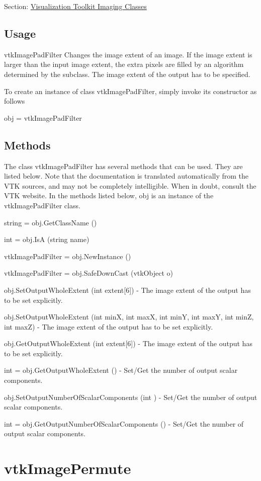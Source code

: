 Section\-: \hyperlink{sec_vtkimaging}{Visualization Toolkit Imaging Classes} \hypertarget{vtkwidgets_vtkxyplotwidget_Usage}{}\subsection{Usage}\label{vtkwidgets_vtkxyplotwidget_Usage}
vtk\-Image\-Pad\-Filter Changes the image extent of an image. If the image extent is larger than the input image extent, the extra pixels are filled by an algorithm determined by the subclass. The image extent of the output has to be specified.

To create an instance of class vtk\-Image\-Pad\-Filter, simply invoke its constructor as follows \begin{DoxyVerb}  obj = vtkImagePadFilter
\end{DoxyVerb}
 \hypertarget{vtkwidgets_vtkxyplotwidget_Methods}{}\subsection{Methods}\label{vtkwidgets_vtkxyplotwidget_Methods}
The class vtk\-Image\-Pad\-Filter has several methods that can be used. They are listed below. Note that the documentation is translated automatically from the V\-T\-K sources, and may not be completely intelligible. When in doubt, consult the V\-T\-K website. In the methods listed below, {\ttfamily obj} is an instance of the vtk\-Image\-Pad\-Filter class. 
\begin{DoxyItemize}
\item {\ttfamily string = obj.\-Get\-Class\-Name ()}  
\item {\ttfamily int = obj.\-Is\-A (string name)}  
\item {\ttfamily vtk\-Image\-Pad\-Filter = obj.\-New\-Instance ()}  
\item {\ttfamily vtk\-Image\-Pad\-Filter = obj.\-Safe\-Down\-Cast (vtk\-Object o)}  
\item {\ttfamily obj.\-Set\-Output\-Whole\-Extent (int extent\mbox{[}6\mbox{]})} -\/ The image extent of the output has to be set explicitly.  
\item {\ttfamily obj.\-Set\-Output\-Whole\-Extent (int min\-X, int max\-X, int min\-Y, int max\-Y, int min\-Z, int max\-Z)} -\/ The image extent of the output has to be set explicitly.  
\item {\ttfamily obj.\-Get\-Output\-Whole\-Extent (int extent\mbox{[}6\mbox{]})} -\/ The image extent of the output has to be set explicitly.  
\item {\ttfamily int = obj.\-Get\-Output\-Whole\-Extent ()} -\/ Set/\-Get the number of output scalar components.  
\item {\ttfamily obj.\-Set\-Output\-Number\-Of\-Scalar\-Components (int )} -\/ Set/\-Get the number of output scalar components.  
\item {\ttfamily int = obj.\-Get\-Output\-Number\-Of\-Scalar\-Components ()} -\/ Set/\-Get the number of output scalar components.  
\end{DoxyItemize}\hypertarget{vtkimaging_vtkimagepermute}{}\section{vtk\-Image\-Permute}\label{vtkimaging_vtkimagepermute}
